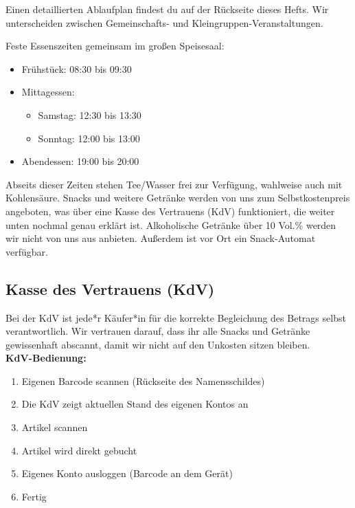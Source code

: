 \documentclass[a5paper,pagesize,twoside,fontsize=8pt,DIV=15]{scrreprt}
\begin{document}







Einen detaillierten Ablaufplan findest du auf der Rückseite dieses Hefts. Wir unterscheiden zwischen Gemeinschafts- und Kleingruppen-Veranstaltungen.

\vspace{-2mm}

Feste Essenszeiten gemeinsam im großen Speisesaal:
\begin{itemize}
\item Frühstück: 08:30 bis 09:30
\item Mittagessen:
\begin{itemize}
    \item Samstag: 12:30 bis 13:30
    \item Sonntag: 12:00 bis 13:00
\end{itemize}
\item Abendessen: 19:00 bis 20:00
\end{itemize}


Abseits dieser Zeiten stehen Tee/Wasser frei zur Verfügung, wahlweise auch mit Kohlensäure. Snacks und weitere Getränke werden von uns zum Selbstkostenpreis angeboten, was über eine Kasse des Vertrauens (KdV) funktioniert, die weiter unten nochmal genau erklärt ist. Alkoholische Getränke über 10 Vol.\% werden wir nicht von uns aus anbieten. Außerdem ist vor Ort ein Snack-Automat verfügbar.


\subsection*{Kasse des Vertrauens (KdV)}

Bei der KdV ist jede*r Käufer*in für die korrekte Begleichung des Betrags selbst verantwortlich. Wir vertrauen darauf, dass ihr alle Snacks und Getränke gewissenhaft abscannt, damit wir nicht auf den Unkosten sitzen bleiben.\\

\textbf{KdV-Bedienung:}
\begin{enumerate}
    \item Eigenen Barcode scannen (Rückseite des Namensschildes)
    \item Die KdV zeigt aktuellen Stand des eigenen Kontos an
    \item Artikel scannen
    \item Artikel wird direkt gebucht 
    \item Eigenes Konto ausloggen (Barcode an dem Gerät)
    \item Fertig
\end{enumerate}
\end{document}
